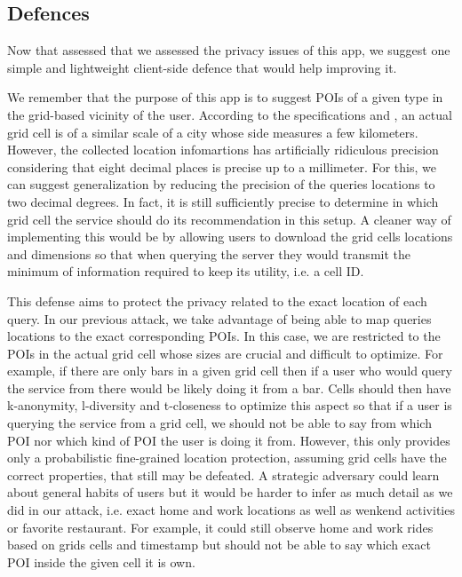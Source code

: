 \documentclass[10pt,conference,compsocconf]{IEEEtran}
\begin{document}
\subsection{Defences}
Now that assessed that we assessed the privacy issues of this app, we suggest one simple and lightweight client-side defence that would help improving it.

We remember that the purpose of this app is to suggest POIs of a given type in the grid-based vicinity of the user. According to the specifications and \cite{deg}, an actual grid cell is of a similar scale of a city whose side measures a few kilometers. However, the collected location infomartions has artificially ridiculous precision considering that eight decimal places is precise up to a millimeter. For this, we can suggest generalization by reducing the precision of the queries locations to two decimal degrees. In fact, it is still sufficiently precise to determine in which grid cell the service should do its recommendation in this setup. A cleaner way of implementing this would be by allowing users to download the grid cells locations and dimensions so that when querying the server they would transmit the minimum of information required to keep its utility, i.e. a cell ID.

This defense aims to protect the privacy related to the exact location of each query. In our previous attack, we take advantage of being able to map queries locations to the exact corresponding POIs. In this case, we are restricted to the POIs in the actual grid cell whose sizes are crucial and difficult to optimize. For example, if there are only bars in a given grid cell then if a user who would query the service from there would be likely doing it from a bar. Cells should then have k-anonymity, l-diversity and t-closeness to optimize this aspect so that if a user is querying the service from a grid cell, we should not be able to say from which POI nor which kind of POI the user is doing it from. However, this only provides only a probabilistic fine-grained location protection, assuming grid cells have the correct properties, that still may be defeated. A strategic adversary could learn about general habits of users but it would be harder to infer as much detail as we did in our attack, i.e. exact home and work locations as well as wenkend activities or favorite restaurant. For example, it could still observe home and work rides based on grids cells and timestamp but should not be able to say which exact POI inside the given cell it is own.
\end{document}
